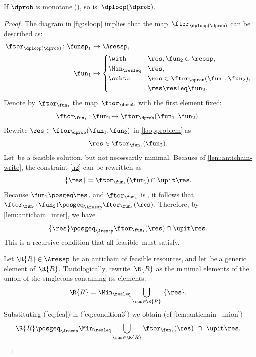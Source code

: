 \begin{proposition}
\label{pro:loop-continuous}If $\dprob$ is monotone (),
so is~$\dploop(\dprob)$.
\end{proposition}
\begin{proof}
The diagram in \cref{fig:sloop} implies that the map~$\ftor_{\dploop(\dprob)}$
can be described as:
\begin{align}
\ftor_{\dploop(\dprob)}\colon\funsp_{1} & \rightarrow\Aressp,\label{eq:loopproblem}\\
\fun_{1} & \mapsto\begin{cases}
\with & \res,\fun_{2}\in\ressp,\\
\Min_{\resleq} & \res,\\
\subto & \res\in\ftor_{\dprob}(\fun_{1},\fun_{2}),\\
 & \res\resleq\fun_{2}.
\end{cases}
\end{align}
Denote by~$\ftor_{\fun_{1}}$ the map~$\ftor_{\dprob}$ with the
first element fixed:
\[
\ftor_{\fun_{1}}\colon\fun_{2}\mapsto\ftor_{\dprob}(\fun_{1},\fun_{2}).
\]
Rewrite $\res\in\ftor_{\dprob}(\fun_{1},\fun_{2})$ in \eqref{loopproblem}
as
\begin{equation}
\res\in\ftor_{\fun_{1}}(\fun_{2}).\label{eq:h2}
\end{equation}
Let~\res be a feasible solution, but not necessarily minimal.
Because of \cref{lem:antichain-write}, the constraint \eqref{h2} can
be rewritten as
\begin{equation}
\{\res\}=\ftor_{\fun_{1}}(\fun_{2})\cap\upit\res.\label{eq:h3}
\end{equation}
Because $\fun_{2}\posgeq\res$, and $\ftor_{\fun_{1}}$ is \scottcontinuous,
it follows that~$\ftor_{\fun_{1}}(\fun_{2})\posgeq_{\Aressp}\ftor_{\fun_{1}}(\res)$.
Therefore, by \cref{lem:antichain_inter}, we have
\begin{equation}
\{\res\}\posgeq_{\Aressp}\ftor_{\fun_{1}}(\res)\cap\upit\res.\label{eq:fea}
\end{equation}
This is a recursive condition that all feasible~\res must satisfy.

Let $\R{R}\in\Aressp$ be an antichain of feasible resources, and
let~\res be a generic element of~$\R{R}$. Tautologically, rewrite~$\R{R}$
as the minimal elements of the union of the singletons containing
its elements:
\begin{equation}
\R{R}=\Min_{\resleq}\bigcup_{\res\in\R{R}}\ \{\res\}.\label{eq:condition3}
\end{equation}
Substituting (\ref{eq:fea}) in (\ref{eq:condition3}) we obtain (cf
\cref{lem:antichain_union})
\begin{equation}
\R{R}\posgeq_{\Aressp}\Min_{\resleq}\bigcup_{\res\in\R{R}}\ftor_{\fun_{1}}(\res)\ \cap\ \upit\res.\label{eq:recursive}
\end{equation}


\end{proof}
